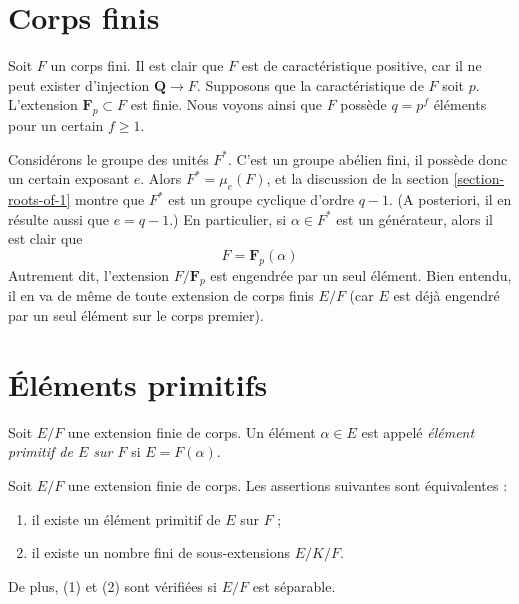 \section{Corps finis}
\label{section-finite}

\noindent
Soit $F$ un corps fini. Il est clair que $F$ est de caractéristique positive,
car il ne peut exister d'injection $\mathbf{Q} \to F$. Supposons que la caractéristique
de $F$ soit $p$. L'extension $\mathbf{F}_p \subset F$ est finie.
Nous voyons ainsi que $F$ possède $q = p^f$ éléments pour un certain $f \geq 1$.

\medskip\noindent
Considérons le groupe des unités $F^*$. C'est un groupe abélien
fini, il possède donc un certain exposant $e$. Alors $F^* = \mu_e(F)$, et la
discussion de la section \ref{section-roots-of-1} montre que $F^*$
est un groupe cyclique d'ordre $q - 1$. (A posteriori, il en résulte aussi que
$e = q - 1$.) En particulier, si $\alpha \in F^*$ est un générateur,
alors il est clair que
$$
F = \mathbf{F}_p(\alpha)
$$
Autrement dit, l'extension $F/\mathbf{F}_p$ est engendrée par un seul
élément. Bien entendu, il en va de même de toute extension de corps finis
$E/F$ (car $E$ est déjà engendré par un seul élément sur
le corps premier).





\section{Éléments primitifs}
\label{section-primitive-element}

\noindent
Soit $E/F$ une extension finie de corps. Un élément $\alpha \in E$
est appelé {\it élément primitif de $E$ sur $F$} si $E = F(\alpha)$.

\begin{lemma}
\label{lemma-primitive-element}
Soit $E/F$ une extension finie de corps. Les assertions suivantes sont équivalentes :
\begin{enumerate}
\item il existe un élément primitif de $E$ sur $F$ ;
\item il existe un nombre fini de sous-extensions $E/K/F$.
\end{enumerate}
De plus, (1) et (2) sont vérifiées si $E/F$ est séparable.
\end{lemma}


